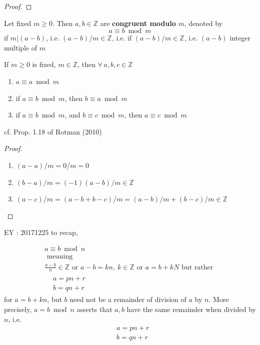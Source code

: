 \begin{proof}
	\end{proof}

\begin{definition}
	Let fixed $m\geq 0$.  Then $a,b \in \mathbb{Z}$ are \textbf{congruent modulo } $m$, denoted by 
	\[
	a \equiv b \bmod{m} 
	\]
if $m|(a-b)$, i.e. $(a-b)/m \in \mathbb{Z}$, i.e. if $(a-b)/m\in\mathbb{Z}$, i.e. $(a-b)$ integer multiple of $m$
\end{definition}

\begin{proposition}
	If $m\geq 0$ is fixed, $m\in \mathbb{Z}$, then $\forall \, a,b,c \in \mathbb{Z}$
	\begin{enumerate}
		\item $a \equiv a\bmod{m}$ 
		\item if $a \equiv b\bmod{m}$, then $b \equiv a\bmod{m}$
		\item if $a \equiv b\bmod{m}$, and $b \equiv c\bmod{m}$, then $a \equiv c\bmod{m}$
	\end{enumerate}
\end{proposition}

cf. Prop. 1.18 of Rotman (2010) \cite{agat:JRotman2010}

\begin{proof}
	\begin{enumerate}
		\item $(a-a)/m=0/m=0$
		\item $(b-a)/m=(-1)(a-b)/m \in \mathbb{Z}$
		\item $(a-c)/m=(a-b+b-c)/m=(a-b)/m+(b-c)/m\in\mathbb{Z}$  
	\end{enumerate}
\end{proof}

EY : 20171225 to recap, 

\begin{equation}
\boxed{ 
	\begin{gathered}
	a \equiv b \bmod{n} \\
	\text{ meaning } \\ 
	\frac{a-b}{n} \in \mathbb{Z} \text{ or }  a- b =kn, \  k\in \mathbb{Z} \text{ or } a  = b+kN \text{ but rather } \\
	\begin{aligned}
	& a = pn + r \\
	& b= qn +r
	\end{aligned}
	\end{gathered}	
}
\end{equation}
for $a= b+ kn$, but $b$ need not be a remainder of division of $a$ by $n$.  More precisely, $a= b\bmod{n}$ asserts that $a,b$ have the same remainder when divided by $n$, i.e. 
\[
\begin{aligned}
& a = pn + r \\ 
& b = qn + r
\end{aligned}
\]



